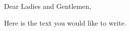 \documentclass[a4paper,11pt]{article}
\begin{document}

Dear Ladies and Gentlemen,

Here is the text you would like to write.

\vfill

\makeatletter
    \begin{flushright}
    	\begin{minipage}{0.40\textwidth}
    		\begin{flushright}
    			\@firstname~\@familyname
    		\end{flushright}
    	\end{minipage}
    \end{flushright}
\makeatother
\end{document}
